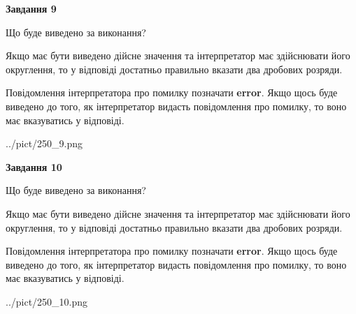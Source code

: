 \documentclass[12pt, ukrainian]{article}
\begin{document}
{\begin {Large}
{\begin {center}\textbf{Завдання 9}\end {center}}\par
Що буде виведено за виконання? \par

Якщо має бути виведено дійсне значення та інтерпретатор має здійснювати його округлення, 
то у відповіді достатньо правильно вказати два дробових розряди.

Повідомлення інтерпретатора про помилку позначати \textbf{error}.
Якщо щось буде виведено до того, як інтерпретатор видасть повідомлення про помилку, 
то воно має вказуватись у відповіді. \par

\begin{center}
	{../pict/250_9.png}
\end{center}
\newpage

{\begin {center}\textbf{Завдання 10}\end {center}}\par
Що буде виведено за виконання? \par

Якщо має бути виведено дійсне значення та інтерпретатор має здійснювати його округлення, 
то у відповіді достатньо правильно вказати два дробових розряди.

Повідомлення інтерпретатора про помилку позначати \textbf{error}.
Якщо щось буде виведено до того, як інтерпретатор видасть повідомлення про помилку, 
то воно має вказуватись у відповіді. \par

\begin{center}
	{../pict/250_10.png}
\end{center}
\newpage

\end {Large}}
\end{document}
